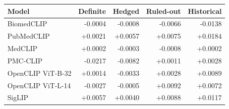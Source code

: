 \begin{tabular}{lrrrr}
\toprule
Model & Definite & Hedged & Ruled-out & Historical \\
\midrule
BiomedCLIP & -0.0004 & -0.0008 & -0.0066 & -0.0138 \\
PubMedCLIP & +0.0021 & +0.0057 & +0.0075 & +0.0184 \\
MedCLIP & +0.0002 & -0.0003 & -0.0008 & +0.0002 \\
PMC-CLIP & -0.0217 & -0.0082 & +0.0011 & +0.0028 \\
OpenCLIP ViT-B-32 & +0.0014 & -0.0033 & +0.0028 & +0.0089 \\
OpenCLIP ViT-L-14 & -0.0027 & -0.0005 & +0.0092 & +0.0072 \\
SigLIP & +0.0057 & +0.0040 & +0.0088 & +0.0117 \\
\bottomrule
\end{tabular}
